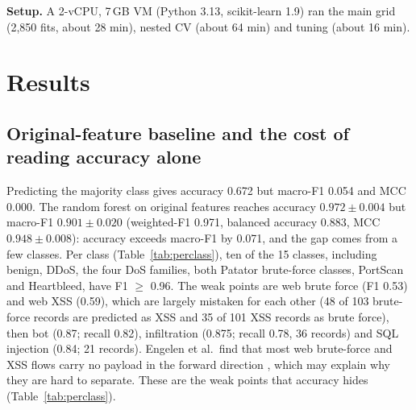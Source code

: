 \documentclass[runningheads]{llncs}
\begin{document}
\textbf{Setup.} A 2-vCPU, 7\,GB VM (Python 3.13, scikit-learn 1.9) ran the main grid (2{,}850 fits, about 28 min), nested CV (about 64 min) and tuning (about 16 min).

\section{Results}
\subsection{Original-feature baseline and the cost of reading accuracy alone}
Predicting the majority class gives accuracy 0.672 but macro-F1 0.054 and MCC 0.000. The random forest on original features reaches accuracy $0.972\pm0.004$ but macro-F1 $0.901\pm0.020$ (weighted-F1 0.971, balanced accuracy 0.883, MCC $0.948\pm0.008$): accuracy exceeds macro-F1 by 0.071, and the gap comes from a few classes. Per class (Table~\ref{tab:perclass}), ten of the 15 classes, including benign, DDoS, the four DoS families, both Patator brute-force classes, PortScan and Heartbleed, have F1 $\ge$ 0.96. The weak points are web brute force (F1 0.53) and web XSS (0.59), which are largely mistaken for each other (48 of 103 brute-force records are predicted as XSS and 35 of 101 XSS records as brute force), then bot (0.87; recall 0.82), infiltration (0.875; recall 0.78, 36 records) and SQL injection (0.84; 21 records). Engelen et al.\ find that most web brute-force and XSS flows carry no payload in the forward direction \cite{engelen2021}, which may explain why they are hard to separate. These are the weak points that accuracy hides (Table~\ref{tab:perclass}).

\begin{table}[htbp]
\caption{Per-class results of the selected model (RF, original features), pooled out-of-fold predictions, first repeat.}\label{tab:perclass}
\centering\scriptsize

\end{table}
\end{document}
